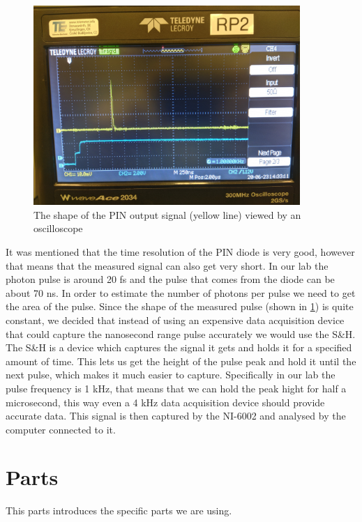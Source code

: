 \documentclass[a4paper, 10pt]{article}
\begin{document}
\begin{figure}[h]
    \centering
    \includegraphics[width=0.9\textwidth]{../images/pulse-shape.jpg}
    \caption{The shape of the PIN output signal (yellow line) viewed by an oscilloscope}
    \label{fig:pulse-shape}
\end{figure}

It was mentioned that the time resolution of the PIN diode is very good, however that means that the measured signal can also get very short.
In our lab the photon pulse is around 20 \si{\femto\second} and the pulse that comes from the diode can be about 70 \si{\nano\second}.
In order to estimate the number of photons per pulse we need to get the area of the pulse.
Since the shape of the measured pulse (shown in \cref{fig:pulse-shape}) is quite constant, we decided that instead of using an expensive data acquisition device that could capture the nanosecond range pulse accurately we would use the S\&H.
The S\&H is a device which captures the signal it gets and holds it for a specified amount of time.
This lets us get the height of the pulse peak and hold it until the next pulse, which makes it much easier to capture.
Specifically in our lab the pulse frequency is 1 \si{\kilo\hertz}, that means that we can hold the peak hight for half a microsecond, this way even a 4 \si{\kilo\hertz} data acquisition device should provide accurate data.
This signal is then captured by the NI-6002 and analysed by the computer connected to it.


\section{Parts}
This parts introduces the specific parts we are using.
\end{document}
